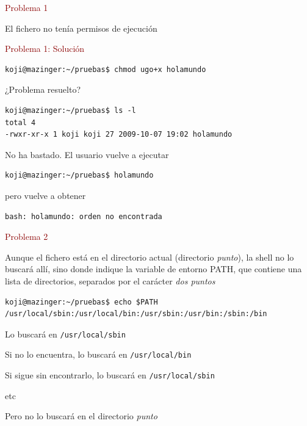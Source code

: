 \documentclass[ucs]{beamer}
\newcommand{\res}[1]{\textcolor{darkred}{#1}}
\begin{document}
\begin{frame}[fragile]
\res{Problema 1}

 El fichero no tenía permisos de ejecución

\res{Problema 1: Solución }
\begin{footnotesize}
\begin{verbatim}
koji@mazinger:~/pruebas$ chmod ugo+x holamundo
\end{verbatim}
\end{footnotesize}

¿Problema resuelto?
\begin{footnotesize}
\begin{verbatim}
koji@mazinger:~/pruebas$ ls -l
total 4
-rwxr-xr-x 1 koji koji 27 2009-10-07 19:02 holamundo
\end{verbatim}
\end{footnotesize}


No ha bastado. El usuario vuelve a ejecutar
\begin{footnotesize}
\begin{verbatim}
koji@mazinger:~/pruebas$ holamundo
\end{verbatim}
\end{footnotesize}
pero vuelve a obtener
\begin{footnotesize}
\begin{verbatim}
bash: holamundo: orden no encontrada
\end{verbatim}
\end{footnotesize}
\end{frame}



\begin{frame}[fragile]
\res{Problema 2}

Aunque el fichero está en el directorio actual (directorio \emph{punto}),
la shell no lo buscará allí, sino donde indique la variable 
de entorno PATH, que contiene una lista de directorios, separados 
por el carácter
\emph{dos puntos} 

\begin{footnotesize}
\begin{verbatim}
koji@mazinger:~/pruebas$ echo $PATH
/usr/local/sbin:/usr/local/bin:/usr/sbin:/usr/bin:/sbin:/bin
\end{verbatim}
\end{footnotesize}

Lo buscará en 
\verb|/usr/local/sbin|

Si no lo encuentra, lo buscará en
\verb|/usr/local/bin|

Si sigue sin encontrarlo, lo buscará en
\verb|/usr/local/sbin|

etc

Pero no lo buscará en el directorio \emph{punto}

\end{frame}
\end{document}
